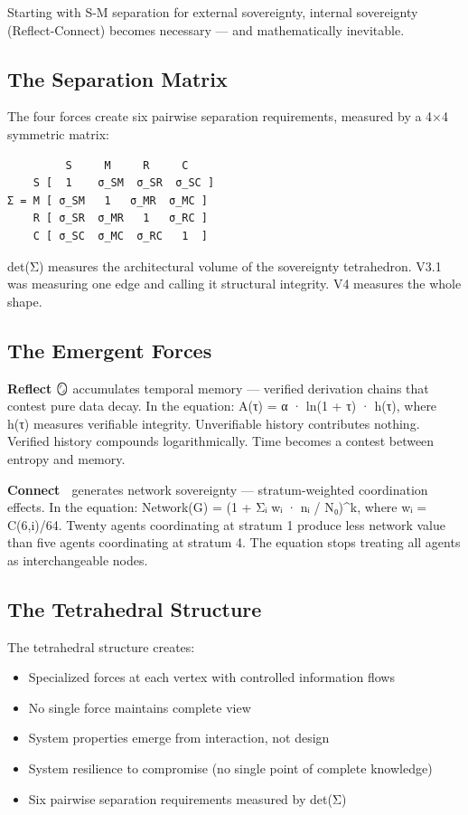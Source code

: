 \documentclass[
  11pt,
]{article}
\begin{document}
Starting with S-M separation for external sovereignty, internal
sovereignty (Reflect-Connect) becomes necessary --- and mathematically
inevitable.

\subsection{The Separation Matrix}\label{the-separation-matrix}

The four forces create six pairwise separation requirements, measured by
a 4×4 symmetric matrix:

\begin{verbatim}
         S     M     R     C
    S [  1    σ_SM  σ_SR  σ_SC ]
Σ = M [ σ_SM   1   σ_MR  σ_MC ]
    R [ σ_SR  σ_MR   1   σ_RC ]
    C [ σ_SC  σ_MC  σ_RC   1  ]
\end{verbatim}

det(Σ) measures the architectural volume of the sovereignty tetrahedron.
V3.1 was measuring one edge and calling it structural integrity. V4
measures the whole shape.

\subsection{The Emergent Forces}\label{the-emergent-forces}

\textbf{Reflect} 🪞 accumulates temporal memory --- verified derivation
chains that contest pure data decay. In the equation: A(τ) = α · ln(1 +
\textbar τ\textbar) · h(τ), where h(τ) measures verifiable integrity.
Unverifiable history contributes nothing. Verified history compounds
logarithmically. Time becomes a contest between entropy and memory.

\textbf{Connect} 🤝 generates network sovereignty --- stratum-weighted
coordination effects. In the equation: Network(G) = (1 + Σᵢ wᵢ · nᵢ /
N₀)\^{}k, where wᵢ = C(6,i)/64. Twenty agents coordinating at stratum 1
produce less network value than five agents coordinating at stratum 4.
The equation stops treating all agents as interchangeable nodes.

\subsection{The Tetrahedral Structure}\label{the-tetrahedral-structure}

The tetrahedral structure creates:

\begin{itemize}
\item
  Specialized forces at each vertex with controlled information flows
\item
  No single force maintains complete view
\item
  System properties emerge from interaction, not design
\item
  System resilience to compromise (no single point of complete
  knowledge)
\item
  Six pairwise separation requirements measured by det(Σ)
\end{itemize}
\end{document}
